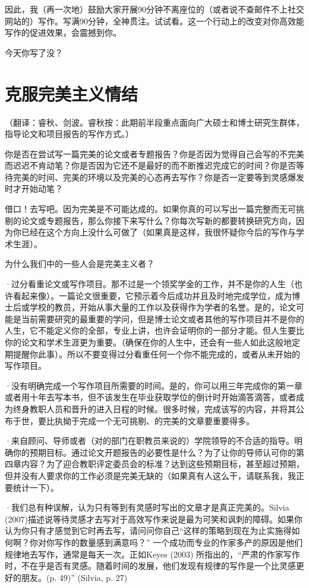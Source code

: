 \documentclass[12pt]{ctexart}
\begin{document}
因此，我（再一次地）鼓励大家开展90分钟不离座位的（或者说不查邮件不上社交网站的）写作。写满90分钟，全神贯注。试试看。这一个行动上的改变对你高效能写作的促进效果，会震撼到你。

今天你写了没？

\section{克服完美主义情结}
（翻译：睿秋、剑波。睿秋按：此期前半段重点面向广大硕士和博士研究生群体，指导论文和项目报告的写作方式。）

你是否在尝试写一篇完美的论文或者专题报告？你是否因为觉得自己会写的不完美而迟迟不肯动笔？你是否因为它还不是最好的而不断推迟完成它的时间？你是否等待完美的时间、完美的环境以及完美的心态再去写作？你是否一定要等到灵感爆发时才开始动笔？

借口！去写吧。因为完美是不可能达成的。如果你真的可以写出一篇完整而无可挑剔的论文或专题报告，那么你接下来写什么？你每次写新的都要转换研究方向，因为你已经在这个方向上没什么可做了（如果真是这样，我很怀疑你今后的写作与学术生涯）。

为什么我们中的一些人会是完美主义者？

·过分看重论文或写作项目。那不过是一个领奖学金的工作，并不是你的人生（也许看起来像）。一篇论文很重要，它预示着今后成功并且及时地完成学位，成为博士后或学校的教员，开始从事大量的工作以及获得作为学者的名誉。是的，论文可能是当前需要研究的最重要的学问，但是博士论文或者其他的写作项目并不是你的人生，它不能定义你的全部，专业上讲，也许会证明你的一部分才能。但人生要比你的论文和学术生涯更为重要。（确保在你的人生中，还会有一些人如此这般地定期提醒你此事）。所以不要变得过分看重任何一个你不能完成的，或者从未开始的写作项目。

·没有明确完成一个写作项目所需要的时间。是的，你可以用三年完成你的第一章或者用十年去写本书，但不该发生在毕业获取学位的倒计时开始滴答滴答，或者成为终身教职人员和晋升的进入日程的时候。很多时候，完成该写的内容，并将其公布于世，要比执拗于完成一个无可挑剔、的完美的文章要重要得多。

·来自顾问、导师或者（对的部门在职教员来说的）学院领导的不合适的指导。明确你的预期目标。通过论文开题报告的必要性是什么？为了让你的导师认可你的第四章内容？为了迎合教职评定委员会的标准？达到这些预期目标，甚至超过预期，但并没有人要求你的工作必须是完美无缺的（如果真有人这么干，请联系我，我正要统计一下）。

·我们总有种误解，认为只有等到有灵感时写出的文章才是真正完美的。Silvia (2007)描述说等待灵感才去写对于高效写作来说是最为可笑和讽刺的障碍。如果你认为你只有才感觉到它时再去写，请问问你自己“这样的策略到现在为止实施得如何啊？你对你写作的数量感到满意吗？” 一个成功而专业的作家多产的原因是他们规律地去写作，通常是每天一次。正如Keyes (2003) 所指出的，“严肃的作家写作时，不在乎是否有灵感。随着时间的发展，他们发现有规律的写作是一个比灵感更好的朋友。(p. 49)” (Silvia, p. 27)
\end{document}
